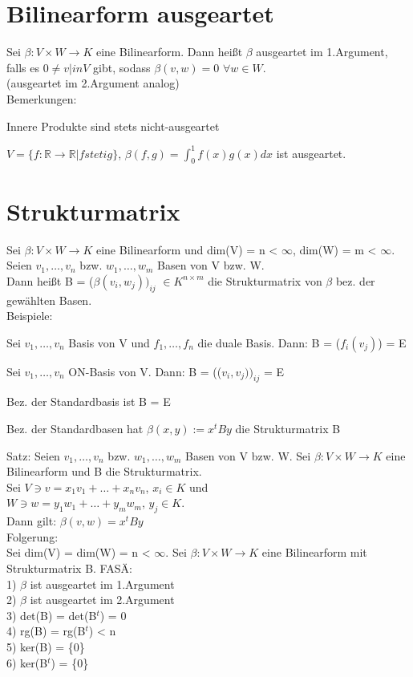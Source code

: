 \section{Bilinearform ausgeartet}
Sei $\beta: V \times W \to K$ eine Bilinearform. Dann heißt $\beta$ ausgeartet im 1.Argument, falls es $0 \neq v |in V$ gibt, sodass $\beta(v,w) = 0$ $\forall w \in W$.\\
(ausgeartet im 2.Argument analog)\\
Bemerkungen:
\begin{compactitem}
\item Innere Produkte sind stets nicht-ausgeartet
\item $V = \{ f: \mathbb{R} \to \mathbb{R} | f stetig \}$, $\beta(f,g) = \displaystyle\int_0^1 f(x) g(x) dx$ ist ausgeartet.
\end{compactitem}

\section{Strukturmatrix}
Sei $\beta: V \times W \to K$ eine Bilinearform und dim(V) = n < $\infty$, dim(W) = m < $\infty$. Seien $v_1, …, v_n$ bzw. $w_1, …, w_m$ Basen von V bzw. W.\\
Dann heißt B = ($\beta(v_i, w_j))_{ij}$ $\in K^{n \times m}$ die Strukturmatrix von $\beta$ bez. der gewählten Basen.\\
Beispiele:
\begin{compactitem}
\item Sei $v_1, …, v_n$ Basis von V und $f_1, …, f_n$ die duale Basis. Dann: B = ($f_i(v_j)$) = E
\item Sei $v_1, …, v_n$ ON-Basis von V. Dann: B = (($v_i, v_j))_{ij}$ = E
\item Bez. der Standardbasis ist B = E
\item Bez. der Standardbasen hat $\beta(x,y) := x^tBy$ die Strukturmatrix B
\end{compactitem}
Satz: Seien $v_1, …, v_n$ bzw. $w_1, …, w_m$ Basen von V bzw. W. Sei $\beta: V \times W \to K$ eine Bilinearform und B die Strukturmatrix.\\
Sei $V \ni v = x_1v_1 + … + x_nv_n$, $x_i \in K$ und\\
\hspace*{10mm} $W \ni w = y_1w_1 + … + y_mw_m$, $y_j \in K$.\\
Dann gilt: $\beta(v, w) = x^tBy$\\
Folgerung:\\
Sei dim(V) = dim(W) = n < $\infty$. Sei $\beta: V \times W \to K$ eine Bilinearform mit Strukturmatrix B. FASÄ:\\
1) $\beta$ ist ausgeartet im 1.Argument\\
2) $\beta$ ist ausgeartet im 2.Argument\\
3) det(B) = det(B$^t$) = 0\\
4) rg(B) = rg(B$^t$) < n\\
5) ker(B) = \{0\}\\
6) ker(B$^t$) = \{0\}\\
